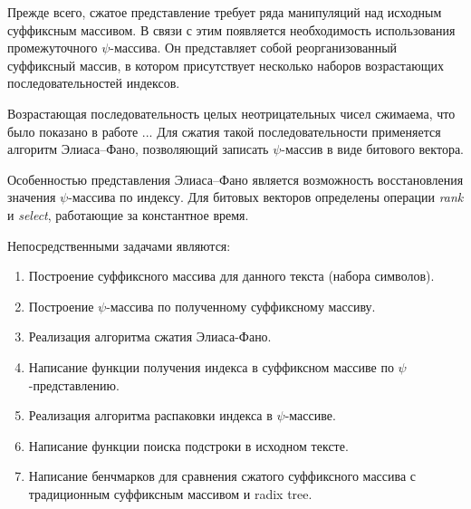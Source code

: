 
Прежде всего, сжатое представление требует ряда манипуляций над исходным суффиксным массивом.
В связи с этим появляется необходимость использования промежуточного $\psi$-массива.
Он представляет собой реорганизованный суффиксный массив,
в котором присутствует несколько наборов возрастающих последовательностей индексов.

Возрастающая последовательность целых неотрицательных чисел сжимаема, что было показано в работе ...
Для сжатия такой последовательности применяется алгоритм Элиаса--Фано, позволяющий записать
$\psi$-массив в виде битового вектора.

Особенностью представления Элиаса--Фано является возможность восстановления значения $\psi$-массива
по индексу. Для битовых векторов определены операции \emph{rank} и \emph{select}, работающие за константное время.

Непосредственными задачами являются:

\begin{enumerate}
    \item Построение суффиксного массива для данного текста (набора символов).
    \item Построение $\psi$-массива по полученному суффиксному массиву.
    \item Реализация алгоритма сжатия Элиаса-Фано.
    \item Написание функции получения индекса в суффиксном массиве по $\psi$-представлению.
    \item Реализация алгоритма распаковки индекса в $\psi$-массиве.
    \item Написание функции поиска подстроки в исходном тексте.
    \item Написание бенчмарков для сравнения сжатого суффиксного массива
    с традиционным суффиксным массивом и radix tree.
\end{enumerate}


